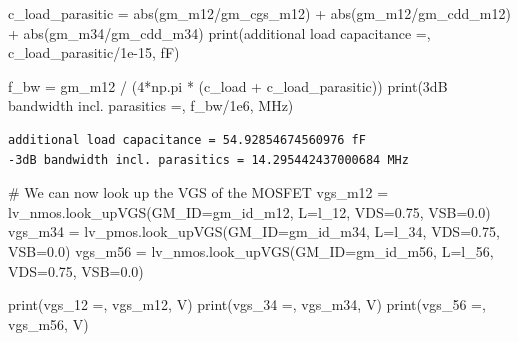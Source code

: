 \documentclass[
  a4paper,
  DIV=11,
  numbers=noendperiod]{scrartcl}
\newenvironment{Shaded}{\begin{snugshade}}{\end{snugshade}}
\newcommand{\BuiltInTok}[1]{\textcolor[rgb]{0.00,0.23,0.31}{#1}}
\newcommand{\CommentTok}[1]{\textcolor[rgb]{0.37,0.37,0.37}{#1}}
\newcommand{\DecValTok}[1]{\textcolor[rgb]{0.68,0.00,0.00}{#1}}
\newcommand{\FloatTok}[1]{\textcolor[rgb]{0.68,0.00,0.00}{#1}}
\newcommand{\NormalTok}[1]{\textcolor[rgb]{0.00,0.23,0.31}{#1}}
\newcommand{\OperatorTok}[1]{\textcolor[rgb]{0.37,0.37,0.37}{#1}}
\newcommand{\StringTok}[1]{\textcolor[rgb]{0.13,0.47,0.30}{#1}}
\begin{document}
\begin{tcolorbox}
\begin{Shaded}
\begin{Highlighting}[]
\NormalTok{c\_load\_parasitic }\OperatorTok{=} \BuiltInTok{abs}\NormalTok{(gm\_m12}\OperatorTok{/}\NormalTok{gm\_cgs\_m12) }\OperatorTok{+} \BuiltInTok{abs}\NormalTok{(gm\_m12}\OperatorTok{/}\NormalTok{gm\_cdd\_m12) }\OperatorTok{+} \BuiltInTok{abs}\NormalTok{(gm\_m34}\OperatorTok{/}\NormalTok{gm\_cdd\_m34)}
\BuiltInTok{print}\NormalTok{(}\StringTok{\textquotesingle{}additional load capacitance =\textquotesingle{}}\NormalTok{, c\_load\_parasitic}\OperatorTok{/}\FloatTok{1e{-}15}\NormalTok{, }\StringTok{\textquotesingle{}fF\textquotesingle{}}\NormalTok{)}

\NormalTok{f\_bw }\OperatorTok{=}\NormalTok{ gm\_m12 }\OperatorTok{/}\NormalTok{ (}\DecValTok{4}\OperatorTok{*}\NormalTok{np.pi }\OperatorTok{*}\NormalTok{ (c\_load }\OperatorTok{+}\NormalTok{ c\_load\_parasitic))}
\BuiltInTok{print}\NormalTok{(}\StringTok{\textquotesingle{}{-}3dB bandwidth incl. parasitics =\textquotesingle{}}\NormalTok{, f\_bw}\OperatorTok{/}\FloatTok{1e6}\NormalTok{, }\StringTok{\textquotesingle{}MHz\textquotesingle{}}\NormalTok{)}
\end{Highlighting}
\end{Shaded}

\begin{verbatim}
additional load capacitance = 54.92854674560976 fF
-3dB bandwidth incl. parasitics = 14.295442437000684 MHz
\end{verbatim}

\begin{Shaded}
\begin{Highlighting}[]
\CommentTok{\# We can now look up the VGS of the MOSFET}
\NormalTok{vgs\_m12 }\OperatorTok{=}\NormalTok{ lv\_nmos.look\_upVGS(GM\_ID}\OperatorTok{=}\NormalTok{gm\_id\_m12, L}\OperatorTok{=}\NormalTok{l\_12, VDS}\OperatorTok{=}\FloatTok{0.75}\NormalTok{, VSB}\OperatorTok{=}\FloatTok{0.0}\NormalTok{)}
\NormalTok{vgs\_m34 }\OperatorTok{=}\NormalTok{ lv\_pmos.look\_upVGS(GM\_ID}\OperatorTok{=}\NormalTok{gm\_id\_m34, L}\OperatorTok{=}\NormalTok{l\_34, VDS}\OperatorTok{=}\FloatTok{0.75}\NormalTok{, VSB}\OperatorTok{=}\FloatTok{0.0}\NormalTok{) }
\NormalTok{vgs\_m56 }\OperatorTok{=}\NormalTok{ lv\_nmos.look\_upVGS(GM\_ID}\OperatorTok{=}\NormalTok{gm\_id\_m56, L}\OperatorTok{=}\NormalTok{l\_56, VDS}\OperatorTok{=}\FloatTok{0.75}\NormalTok{, VSB}\OperatorTok{=}\FloatTok{0.0}\NormalTok{) }

\BuiltInTok{print}\NormalTok{(}\StringTok{\textquotesingle{}vgs\_12 =\textquotesingle{}}\NormalTok{, vgs\_m12, }\StringTok{\textquotesingle{}V\textquotesingle{}}\NormalTok{)}
\BuiltInTok{print}\NormalTok{(}\StringTok{\textquotesingle{}vgs\_34 =\textquotesingle{}}\NormalTok{, vgs\_m34, }\StringTok{\textquotesingle{}V\textquotesingle{}}\NormalTok{)}
\BuiltInTok{print}\NormalTok{(}\StringTok{\textquotesingle{}vgs\_56 =\textquotesingle{}}\NormalTok{, vgs\_m56, }\StringTok{\textquotesingle{}V\textquotesingle{}}\NormalTok{)}
\end{Highlighting}
\end{Shaded}


\end{tcolorbox}
\end{document}
